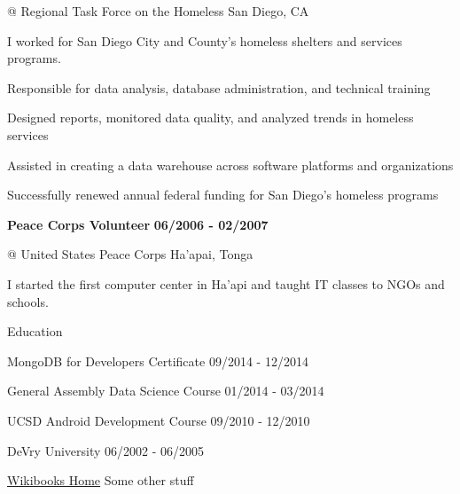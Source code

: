 \documentclass[11pt,letterpaper]{article}
\begin{document}
\normalsize{\textcolor{customgray}{@ Regional Task Force on the Homeless}} \hfill
\normalsize{\textcolor{customgray}{San Diego, CA}}

\normalsize{I worked for San Diego City and County's homeless shelters and services programs.}
\smallskip
\begin{itemize*}  %
    \item Responsible for data analysis, database administration, and technical training
    \item Designed reports, monitored data quality, and analyzed trends in homeless services
    \item Assisted in creating a data warehouse across software platforms and organizations
    \item Successfully renewed annual federal funding for San Diego’s homeless programs
\end{itemize*}

\bigskip


\large{\textbf{Peace Corps Volunteer}} \hfill \large{\textbf{06/2006 - 02/2007}}

\normalsize{\textcolor{customgray}{@ United States Peace Corps}} \hfill
\normalsize{\textcolor{customgray}{Ha'apai, Tonga}}

\normalsize{I started the first computer center in Ha’api and taught IT classes to NGOs and schools.}
\smallskip

\bigskip
\medskip


\textsf{\textcolor{customlightblue}{\Large{Education}}} %

\smallskip

\normalsize{MongoDB for Developers Certificate} \hfill \normalsize{09/2014 - 12/2014}

\normalsize{General Assembly Data Science Course} \hfill \normalsize{01/2014 - 03/2014}

\normalsize{UCSD Android Development Course} \hfill \normalsize{09/2010 - 12/2010}

\normalsize{DeVry University} \hfill \normalsize{06/2002 - 06/2005}

\href{http://www.wikibooks.org}{Wikibooks Home} \hfill \normalsize{Some other stuff}

\end{document}
